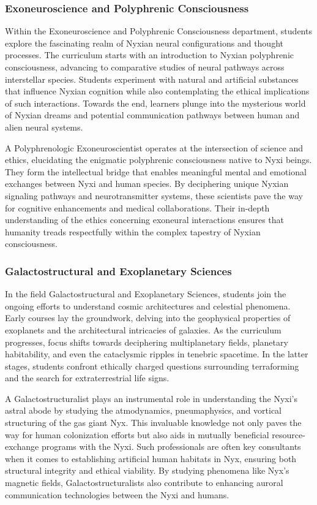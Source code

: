 \subsubsection{Exoneuroscience and Polyphrenic Consciousness}
Within the Exoneuroscience and Polyphrenic Consciousness department, students
explore the fascinating realm of Nyxian neural configurations and thought
processes. The curriculum starts with an introduction to Nyxian polyphrenic
consciousness, advancing to comparative studies of neural pathways across
interstellar species. Students experiment with natural and artificial
substances that influence Nyxian cognition while also contemplating the ethical
implications of such interactions. Towards the end, learners plunge into the
mysterious world of Nyxian dreams and potential communication pathways between
human and alien neural systems.

A Polyphrenologic Exoneuroscientist operates at the intersection of science and
ethics, elucidating the enigmatic polyphrenic consciousness native to Nyxi
beings. They form the intellectual bridge that enables meaningful mental and
emotional exchanges between Nyxi and human species. By deciphering unique
Nyxian signaling pathways and neurotransmitter systems, these scientists pave
the way for cognitive enhancements and medical collaborations. Their in-depth
understanding of the ethics concerning exoneural interactions ensures that
humanity treads respectfully within the complex tapestry of Nyxian
consciousness.

\subsubsection{Galactostructural and Exoplanetary Sciences}
In the field Galactostructural and Exoplanetary Sciences, students join the
ongoing efforts to understand cosmic architectures and celestial phenomena.
Early courses lay the groundwork, delving into the geophysical properties of
exoplanets and the architectural intricacies of galaxies. As the curriculum
progresses, focus shifts towards deciphering multiplanetary fields, planetary
habitability, and even the cataclysmic ripples in tenebric spacetime. In the
latter stages, students confront ethically charged questions surrounding
terraforming and the search for extraterrestrial life signs.

A Galactostructuralist plays an instrumental role in understanding the Nyxi's
astral abode by studying the atmodynamics, pneumaphysics, and vortical
structuring of the gas giant Nyx. This invaluable knowledge not only paves the
way for human colonization efforts but also aids in mutually beneficial
resource-exchange programs with the Nyxi. Such professionals are often key
consultants when it comes to establishing artificial human habitats in Nyx,
ensuring both structural integrity and ethical viability. By studying phenomena
like Nyx's magnetic fields, Galactostructuralists also contribute to enhancing
auroral communication technologies between the Nyxi and humans.

